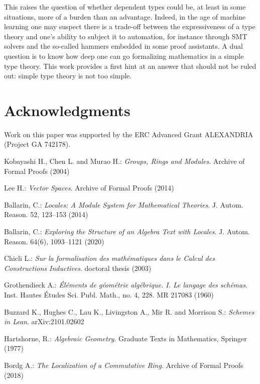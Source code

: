 \documentclass[12pt]{scrartcl}
\begin{document}
This raises the question of whether dependent types could be, at least in some situations, more of a burden than an advantage. Indeed, in the age of machine learning one may suspect there is a trade-off between the expressiveness of a type theory and one's ability to subject it to automation, for instance through SMT solvers and the so-called hammers embedded in some proof assistants. A dual question is to know how deep one can go formalizing mathematics in a simple type theory. This work provides a first hint at an answer that should not be ruled out: simple type theory is not too simple.       

\section*{Acknowledgments}

Work on this paper was supported by the ERC Advanced Grant ALEXANDRIA (Project GA 742178).  			


\begin{thebibliography}{}
	
	Kobayashi H., Chen L. and Murao H.:
	\newblock \textit{Groups, Rings and Modules}.
	\newblock Archive of Formal Proofs (2004)
	
	Lee H.:
	\newblock \textit{Vector Spaces}.
	\newblock Archive of Formal Proofs (2014)
	
	Ballarin, C.: 
	\newblock \textit{Locales: A Module System for Mathematical Theories}.
	\newblock J. Autom. Reason. 52, 123–153 (2014)
	
	Ballarin, C.:
	\newblock \textit{Exploring the Structure of an Algebra Text with Locales}. 
	\newblock J. Autom. Reason. 64(6), 1093–1121 (2020)
	
	Chicli L.:
	\newblock \textit{Sur la formalisation des math\'ematiques dans le Calcul des Constructions Inductives}.
	\newblock doctoral thesis (2003)
	
	Grothendieck A.:
	\newblock \textit{\'El\'ements de g\'eom\'etrie alg\'ebrique. I. Le langage des sch\'emas}.
	\newblock Inst. Hautes \'Etudes Sci. Publ. Math., no. 4, 228. MR 217083 (1960)
	
	Buzzard K., Hughes C., Lau K., Livingston A., Mir R. and Morrison S.:
	\newblock \textit{Schemes in Lean}.
	\newblock arXiv:2101.02602
	
	Hartshorne, R.:
	\newblock \textit{Algebraic Geometry}.
	\newblock Graduate Texts in Mathematics, Springer (1977)
	
	Bordg A.:
	\newblock \textit{The Localization of a Commutative Ring}.
	\newblock Archive of Formal Proofs (2018)
	
\end{thebibliography}

					

		
\end{document}
